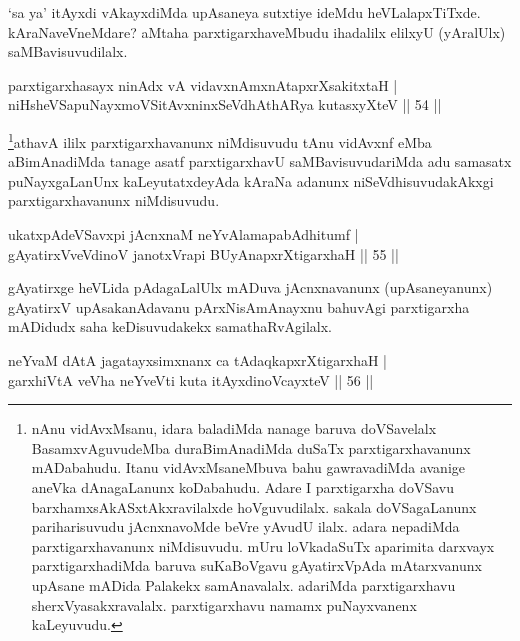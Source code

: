 \begin{artha} 
`sa ya' itAyxdi vAkayxdiMda upAsaneya sutxtiye ideMdu heVLalapxTiTxde. 
kAraNaveVneMdare? aMtaha parxtigarxhaveMbudu ihadalilx elilxyU 
(yAralUlx) saMBavisuvudilalx.
\end{artha}


\begin{shl}
parxtigarxhasayx ninAdx vA vidavxnAmxnAtapxrXsakitxtaH | \\
niHsheVSapuNayxmoVSitAvxninxSeVdhAthARya kutasxyXteV \hfill ||  54 || 
\end{shl}

\begin{artha} 
\footnote{nAnu vidAvxMsanu, idara baladiMda nanage baruva 
doVSavelalx BasamxvAguvudeMba duraBimAnadiMda duSaTx 
parxtigarxhavanunx mADabahudu. Itanu vidAvxMsaneMbuva bahu 
gawravadiMda avanige aneVka dAnagaLanunx koDabahudu. Adare I 
parxtigarxha doVSavu barxhamxsAkASxtAkxravilalxde hoVguvudilalx. 
sakala doVSagaLanunx pariharisuvudu jAcnxnavoMde beVre yAvudU ilalx. 
adara nepadiMda parxtigarxhavanunx niMdisuvudu. mUru loVkadaSuTx 
aparimita darxvayx parxtigarxhadiMda baruva suKaBoVgavu gAyatirxVpAda 
mAtarxvanunx upAsane mADida Palakekx samAnavalalx. adariMda 
parxtigarxhavu sherxVyasakxravalalx. parxtigarxhavu namamx 
puNayxvanenx kaLeyuvudu.}athavA ililx parxtigarxhavanunx niMdisuvudu tAnu 
vidAvxnf eMba aBimAnadiMda tanage asatf parxtigarxhavU 
saMBavisuvudariMda adu samasatx puNayxgaLanUnx kaLeyutatxdeyAda kAraNa 
adanunx niSeVdhisuvudakAkxgi parxtigarxhavanunx niMdisuvudu.
\end{artha}

\begin{shl}
ukatxpAdeVSavxpi jAcnxnaM neYvAlamapabAdhitumf | \\
gAyatirxVveVdinoV janotxVrapi BUyAnapxrXtigarxhaH \hfill ||  55 || 
\end{shl}

\begin{artha} 
gAyatirxge heVLida pAdagaLalUlx mADuva jAcnxnavanunx (upAsaneyanunx) 
gAyatirxV upAsakanAdavanu pArxNisAmAnayxnu bahuvAgi parxtigarxha 
mADidudx saha keDisuvudakekx samathaRvAgilalx.
\end{artha}


\begin{shl}
neYvaM dAtA jagatayxsimxnanx ca tAdaqkapxrXtigarxhaH | \\
garxhiVtA veVha neYveVti kuta itAyxdinoVcayxteV \hfill ||  56 ||
\end{shl}

